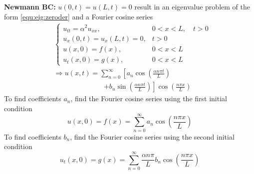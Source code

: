 \documentclass[10pt,leqno]{article}
\begin{document}
\begin{multicols}{2}
\textbf{Newmann BC:} $u(0,t) = u(L,t)= 0$ result in an eigenvalue pro\-blem of the form \eqref{equ:eig:zeroder} and a Fourier cosine series
\begin{align}
    & \left\{ \begin{array}{ll}
            u_{tt} = \alpha^{2} u_{xx}, & 0<x<L, \quad t>0 \\
            u_{x}(0,t) = u_{x}(L,t)= 0, & t>0 \\
            u(x,0) = f(x), & 0<x<L \\
            u_{t}(x,0) = g(x), & 0<x<L
    \end{array}\right. \label{equ:wave:neumann} \\
    & \Rightarrow u(x,t)= \sum_{n=0}^{\infty}\left[ a_{n}\cos\left( \frac{\alpha n\pi t}{L} \right) \right. \\
    & \hspace{3cm} \left. + b_{n}\sin\left( \frac{\alpha n\pi t}{L} \right) \right] \cos\left(\frac{n\pi x}{L}\right) \nonumber
\end{align}
To find coefficients $a_{n}$, find the Fourier cosine series using the first initial condition
\begin{equation}
    u(x,0)=f(x)=\sum_{n=0}^{\infty} a_{n} \cos \left(\frac{n\pi x}{L}\right)
\end{equation}
To find coefficients $b_{n}$, find the Fourier cosine series using the second initial condition
\begin{equation}
    u_{t}(x,0)=g(x)=\sum_{n=0}^{\infty} \frac{\alpha n\pi}{L} b_{n} \cos \left(\frac{n\pi x}{L}\right)
\end{equation}

\end{multicols}
\end{document}
